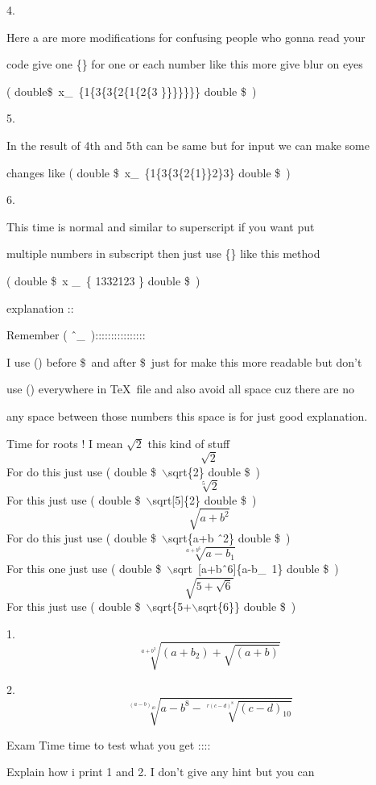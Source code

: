 \documentclass[11pt]{article}
\begin{document}
 4.
 
 Here a are more modifications for confusing people who gonna read your 
 
 code give one \{\} for one or each number like this more give blur on eyes
 
 ( double\$\ x\_\ \{1\{3\{3\{2\{1\{2\{3 \}\}\}\}\}\}\} double \$\ )
 
 5.
 
 In the result of 4th and 5th can be same but for input we can make some 
 
 changes like ( double \$\ x\_\ \{1\{3\{3\{2\{1\}\}2\}3\} double \$\ )
 
 \vspace{2cm}
 
 6.
 
 This time is normal and similar to superscript if you want put
 
  multiple numbers in subscript then just use \{\} like this method
 
 ( double \$\ x \_\ \{ 1332123 \} double \$\ )
 
 \vspace{2cm}
 
  explanation ::

 Remember ( \^\  \_\ )::::::::::::::::
 
 I use () before \$\ and after \$\ just for make this more readable but don't
 
 use () everywhere in \TeX\ file and also avoid all space cuz there are no
 
any space between those numbers this space is for just good explanation.

\pagebreak

Time for roots ! I mean  $\sqrt{2}$ this kind of stuff
$$\sqrt{2}$$
For do this just use ( double \$\ $\backslash$sqrt\{2\} double \$\ )
$$\sqrt[5]{2}$$
For this just use ( double \$\ $\backslash$sqrt[5]\{2\} double \$\ )
$$\sqrt{a+b^2}$$
For do this just use ( double \$\ $\backslash$sqrt\{a+b \^\ 2\} double \$\ )
$$\sqrt[a+b^6]{a-b_1}$$
For this one just use ( double \$\ $\backslash$sqrt\ [a+b\^\ 6]\{a-b\_\ 1\} double \$\ )
$$\sqrt{5+\sqrt{6}}$$
For this just use ( double \$\ $\backslash$sqrt\{5+$\backslash$sqrt\{6\}\} double \$\ )

1. 
$$\sqrt[a+b^3]{(a+b_2)+\sqrt{(a+b)}}$$

2.
$$\sqrt[(a-b)_10]{a-b^8-\sqrt[r(c-d)^8]{(c-d)_{10}}}$$

Exam Time time to test what you get :::: 

Explain how i print 1 and 2. I don't give any hint but you can
\end{document}
